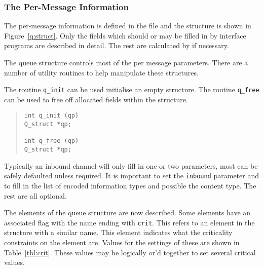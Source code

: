\subsubsection{The Per-Message Information}

The per-message information is defined in the file  and the
structure is shown in Figure~\ref{q:struct}. Only the fields which
should or may be filled in by interface programs are
described in detail. The rest are calculated by  if
necessary.


The queue structure controls most of the per message parameters. There
are a number of utility routines to help manipulate these structures.

The routine \verb|q_init| can be used initialise an empty structure.
The routine \verb|q_free| can be used to free off allocated fields
within the structure.
\begin{quote}\begin{verbatim}
int q_init (qp)
Q_struct *qp;

int q_free (qp)
Q_struct *qp;
\end{verbatim}\end{quote}

Typically an inbound channel will only fill in one or two parameters,
most can be safely defaulted unless required. It is important to set
the \verb|inbound| parameter and to fill in the list of encoded
information types and possible the content type. The rest are all
optional.

The elements of the queue structure are now described. Some elements
have an associated flag with the name ending with \verb|crit|. This
refers to an element in the structure with a similar name. This
element indicates what the criticality constraints on the element
are. Values for the settings of these are shown in
Table~\ref{tbl:crit}. These values may be logically or'd together to
set several critical values.


